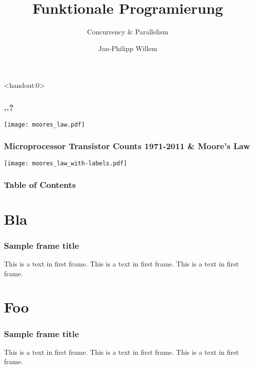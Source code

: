 \documentclass{beamer}
\title{Funktionale Programierung}
\subtitle{Concurrency \& Parallelism}
\author{Jan-Philipp Willem}
\institute{Hochschule Mannheim}
\date{SEM WS2016, \par Prof. Dr. Sandro Leuchter}
\begin{document}
\begin{frame}<handout:0>
  \frametitle{..?}
  \centering
  \texttt{[image: moores\_law.pdf]}
\end{frame}
 
\begin{frame}
  \frametitle{Microprocessor Transistor Counts 1971-2011 \& Moore's Law}
  \centering
  \texttt{[image: moores\_law\_with-labels.pdf]}
\end{frame}

\frame{\titlepage}

\begin{frame}
\frametitle{Table of Contents}
\tableofcontents
\end{frame}

\section[Bla]{Bla}
\begin{frame}
\frametitle{Sample frame title}
This is a text in first frame. This is a text in first frame. This is a text in first frame.
\end{frame}

\section[Foo]{Foo}
\begin{frame}
\frametitle{Sample frame title}
This is a text in first frame. This is a text in first frame. This is a text in first frame.
\end{frame}
\end{document}
